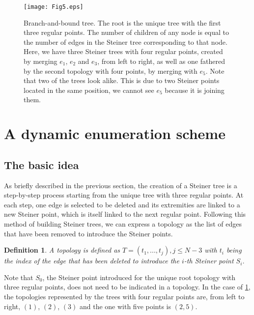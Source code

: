 \documentclass{article}
\theoremstyle{plain}
\newtheorem{definition}[theorem]{Definition}
\begin{document}
\begin{figure}
\centering
\texttt{[image: Fig5.eps]} 
\caption{\mbox{Branch-and-bound} tree. The root is the unique tree with the first three regular points. The number of children of any node is equal to the number of edges in the Steiner tree corresponding to that node. Here, we have three Steiner trees with four regular points, created by merging $e_1$, $e_2$ and $e_3$, from left to right, as well as one fathered by the second topology with four points, by merging with $e_5$. Note that two of the trees look alike. This is due to two Steiner points located in the same position, we cannot see $e_5$ because it is joining them.   \label{bbtree}}
\end{figure}













\section{A dynamic enumeration scheme}
\label{sec:scheme}
\subsection{The basic idea}
As briefly described in the previous section, the creation of a Steiner tree is a step-by-step process starting from the unique tree with three regular points. 
At each step, one edge is selected to be deleted and its extremities are linked to a new Steiner point, which is itself linked to the next regular point. 
Following this method of building Steiner trees, we can express a topology as the list of edges that have been removed to introduce the Steiner points. 
\begin{definition}
A topology is defined as $T=(t_1,...,t_j), j\leq N-3$ with $t_i$ being the index of the edge that has been deleted to introduce the $i$-th Steiner point $S_i$. 
\end{definition}
Note that $S_0$, the Steiner point introduced for the unique root topology with three regular points, does not need to be indicated in a topology. 
In the case of \cref{bbtree}, the topologies represented by the trees with four regular points are, from left to right, $(1)$, $(2)$, $(3)$ and the one with five points is $(2,5)$. 
\end{document}
